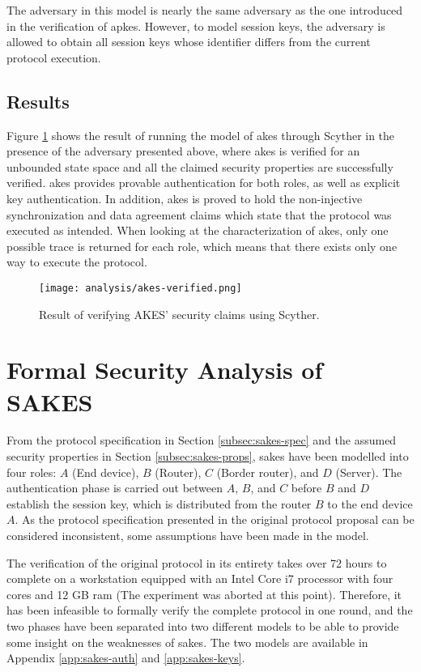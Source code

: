 The adversary in this model is nearly the same adversary as the one introduced in the verification of \gls{apkes}. However, to model session keys, the adversary is allowed to obtain all session keys whose identifier differs from the current protocol execution. 

\subsection{Results}

Figure \ref{fig:akes-verified} shows the result of running the model of \gls{akes} through Scyther in the presence of the adversary presented above, where \gls{akes} is verified for an unbounded state space and all the claimed security properties are successfully verified. \gls{akes} provides provable authentication for both roles, as well as explicit key authentication. In addition, \gls{akes} is proved to hold the non-injective synchronization and data agreement claims which state that the protocol was executed as intended. When looking at the characterization of \gls{akes}, only one possible trace is returned for each role, which means that there exists only one way to execute the protocol.

\begin{figure}[h]
	\centering
	\texttt{[image: analysis/akes-verified.png]}
	\caption{Result of verifying AKES' security claims using Scyther.}
	\label{fig:akes-verified}
\end{figure}


\section{Formal Security Analysis of SAKES}
\label{sec:sakes-analysis}

From the protocol specification in Section \ref{subsec:sakes-spec} and the assumed security properties in Section \ref{subsec:sakes-props}, \gls{sakes} have been modelled into four roles: $A$ (End device), $B$ (Router), $C$ (Border router), and $D$ (Server). The authentication phase is carried out between $A$, $B$, and $C$ before $B$ and $D$ establish the session key, which is distributed from the router $B$ to the end device $A$. As the protocol specification presented in the original protocol proposal can be considered inconsistent, some assumptions have been made in the model.

The verification of the original protocol in its entirety takes over 72 hours to complete on a workstation equipped with an Intel Core i7 processor with four cores and 12 GB \gls{ram} (The experiment was aborted at this point). Therefore, it has been infeasible to formally verify the complete protocol in one round, and the two phases have been separated into two different models to be able to provide some insight on the weaknesses of \gls{sakes}. The two models are available in Appendix \ref{app:sakes-auth} and \ref{app:sakes-keys}.


